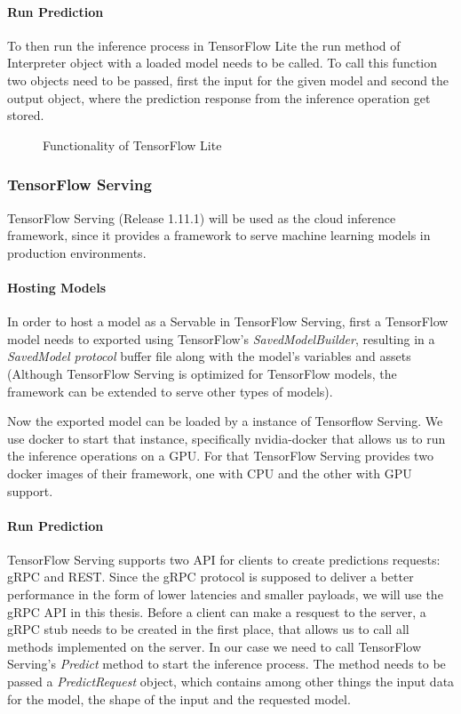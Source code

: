 \paragraph{Run Prediction}

To then run the inference process in TensorFlow Lite the run method of Interpreter object with a loaded model needs to be called. To call this function two objects need to be passed, first the input for the given model and second the output object, where the prediction response from the inference operation get stored. 
\begin{figure}[H]
\centering

\caption{Functionality of TensorFlow Lite}
\label{fig:edge}
\end{figure}
\subsubsection{TensorFlow Serving}
\label{chap:TFServing}
TensorFlow Serving (Release 1.11.1) will be used as the cloud inference framework, since it provides a framework to serve machine learning models in production environments. 



\paragraph{Hosting Models}
In order to host a model as a Servable in TensorFlow Serving, first a TensorFlow model needs to exported using TensorFlow's \emph{SavedModelBuilder}, resulting in a \emph{SavedModel protocol} buffer file along with the model’s variables and assets (Although TensorFlow Serving is optimized for TensorFlow models, the framework can be extended to serve other types of models).

Now the exported model can be loaded by a instance of Tensorflow Serving.
We use docker to start that instance, specifically nvidia-docker that allows us to run the inference operations on a GPU. For that TensorFlow Serving provides two docker images of their framework, one with CPU and the other with GPU support.

\paragraph{Run Prediction}
TensorFlow Serving supports two API for clients to create predictions requests: gRPC and REST. Since the gRPC protocol is supposed to deliver a better performance in the form of lower latencies and smaller payloads, we will use the gRPC API in this thesis.
Before a client can make a resquest to the server, a gRPC stub needs to be created in the first place, that allows us to call all methods implemented on the server. In our case we need to call TensorFlow Serving's \emph{Predict} method to start the inference process. The method needs to be passed a \emph{PredictRequest} object, which contains among other things the input data for the model, the shape of the input and the requested model.%

